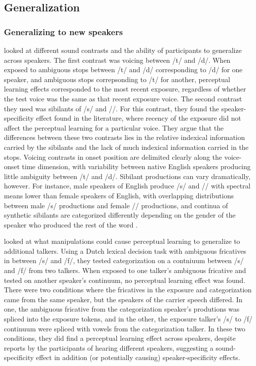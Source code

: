 \subsection{Generalization}
\label{sec:generalization}

\subsubsection{Generalizing to new speakers}
\label{sec:speakergeneralization}

\citet{Kraljic2007} looked at different sound contrasts and the ability of participants to generalize across speakers.  
The first contrast was voicing between /t/ and /d/.  
When exposed to ambiguous stops between /t/ and /d/ corresponding to /d/ for one speaker, and ambiguous stops correpsonding to /t/ for another, perceptual learning effects corresponded to the most recent exposure, regardless of whether the test voice was the same as that recent exposure voice.  
The second contrast they used was sibilants of /s/ and /\textesh/. 
For this contrast, they found the speaker-specificity effect found in the literature, where recency of the exposure did not affect the perceptual learning for a particular voice.
They argue that the differences between these two contrasts lies in the relative indexical information carried by the sibilants and the lack of much indexical information carried in the stops.
Voicing contrasts in onset position are delimited clearly along the voice-onset time dimension, with variability between native English speakers producing little ambiguity between /t/ and /d/.
Sibilant productions can vary dramatically, however.
For instance, male speakers of English produce /s/ and /\textesh/ with spectral means lower than female speakers of English, with overlapping distributions between male /s/ productions and female /\textesh/ productions, and continua of synthetic sibilants are categorized differently depending on the gender of the speaker who produced the rest of the word \citep{Strand1996}.  

\citet{Eisner2005} looked at what manipulations could cause perceptual learning to generalize to additional talkers.  
Using a Dutch lexical decision task with ambiguous fricatives in between /s/ and /f/, they tested categorization on a contniuum between /s/ and /f/ from two talkers.  
When exposed to one talker's ambiguous fricative and tested on another speaker's continuum, no perceptual learning effect was found.  
There were two conditions where the fricatives in the exposure and categorization came from the same speaker, but the speakers of the carrier speech differed.  
In one, the ambiguous fricative from the categorization speaker's produtions was spliced into the exposure tokens, and in the other, the exposure talker's /s/ to /f/ continuum were spliced with vowels from the categorization talker.
In these two conditions, they did find a perceptual learning effect across speakers, despite reports by the participants of hearing different speakers, suggesting a sound-specificity effect in addition (or potentially causing) speaker-specificity effects. 

